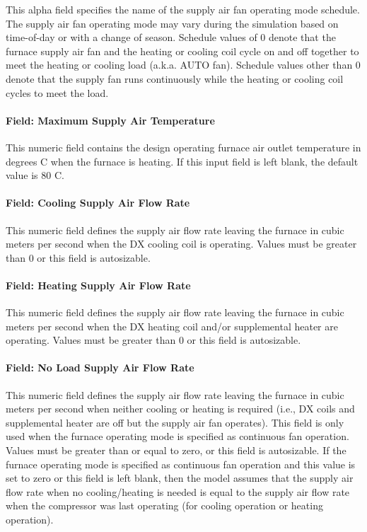 This alpha field specifies the name of the supply air fan operating mode schedule. The supply air fan operating mode may vary during the simulation based on time-of-day or with a change of season. Schedule values of 0 denote that the furnace supply air fan and the heating or cooling coil cycle on and off together to meet the heating or cooling load (a.k.a. AUTO fan). Schedule values other than 0 denote that the supply fan runs continuously while the heating or cooling coil cycles to meet the load.

\paragraph{Field: Maximum Supply Air Temperature}\label{field-maximum-supply-air-temperature-1-000}

This numeric field contains the design operating furnace air outlet temperature in degrees C when the furnace is heating. If this input field is left blank, the default value is 80 C.

\paragraph{Field: Cooling Supply Air Flow Rate}\label{field-cooling-supply-air-flow-rate-1-000}

This numeric field defines the supply air flow rate leaving the furnace in cubic meters per second when the DX cooling coil is operating. Values must be greater than 0 or this field is autosizable.

\paragraph{Field: Heating Supply Air Flow Rate}\label{field-heating-supply-air-flow-rate-1-000}

This numeric field defines the supply air flow rate leaving the furnace in cubic meters per second when the DX heating coil and/or supplemental heater are operating. Values must be greater than 0 or this field is autosizable.

\paragraph{Field: No Load Supply Air Flow Rate}\label{field-no-load-supply-air-flow-rate-1-000}

This numeric field defines the supply air flow rate leaving the furnace in cubic meters per second when neither cooling or heating is required (i.e., DX coils and supplemental heater are off but the supply air fan operates). This field is only used when the furnace operating mode is specified as continuous fan operation. Values must be greater than or equal to zero, or this field is autosizable. If the furnace operating mode is specified as continuous fan operation and this value is set to zero or this field is left blank, then the model assumes that the supply air flow rate when no cooling/heating is needed is equal to the supply air flow rate when the compressor was last operating (for cooling operation or heating operation).

